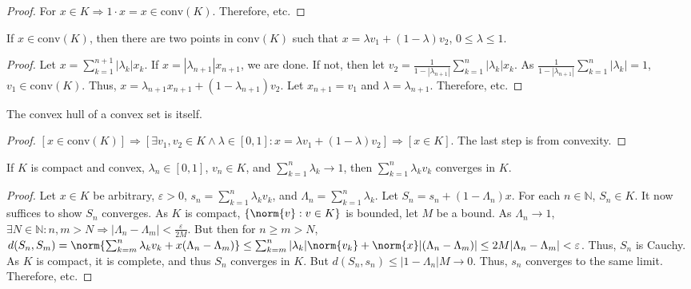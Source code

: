 \documentclass[crop=false,class=article,oneside]{standalone}
\begin{document}
        \begin{proof}
        For $x\in K \Rightarrow 1\cdot x=x \in \textrm{conv}(K)$. Therefore, etc.
        \end{proof}
        \begin{lemma}
        If $x\in \textrm{conv}(K)$, then there are two points in $\textrm{conv}(K)$ such that $x = \lambda v_1 +(1- \lambda) v_2$, $0 \leq \lambda \leq 1$.
        \end{lemma}
        \begin{proof}
        Let $x=\sum_{k=1}^{n+1}|\lambda_k| x_k$. If $x=|\lambda_{n+1}|x_{n+1}$, we are done. If not, then let $v_2 = \frac{1}{1-|\lambda_{n+1}|}\sum_{k=1}^{n}|\lambda_k|x_k$. As $\frac{1}{1-|\lambda_{n+1}|}\sum_{k=1}^{n}|\lambda_k| = 1$, $v_1\in \textrm{conv}(K)$. Thus, $x = \lambda_{n+1}x_{n+1}+(1-\lambda_{n+1})v_2$. Let $x_{n+1}=v_1$ and $\lambda = \lambda_{n+1}$. Therefore, etc.
        \end{proof}
        \begin{theorem}
        The convex hull of a convex set is itself.
        \end{theorem}
        \begin{proof}
        $[x\in \textrm{conv}(K)]\Rightarrow [\exists v_1,v_2\in K\land \lambda\in[0,1]:x=\lambda v_1+(1-\lambda)v_2]\Rightarrow [x\in K]$. The last step is from convexity.
        \end{proof}
        \begin{theorem}
        If $K$ is compact and convex, $\lambda_n\in[0,1]$, $v_n\in K$, and $\sum_{k=1}^{n}\lambda_k \rightarrow 1$, then $\sum_{k=1}^{n}\lambda_k v_k$ converges in $K$.
        \end{theorem}
        \begin{proof}
        Let $x\in K$ be arbitrary, $\varepsilon>0$, $s_n = \sum_{k=1}^{n}\lambda_k v_k$, and $\Lambda_n = \sum_{k=1}^{n}\lambda_k$. Let $S_n = s_n + (1-\Lambda_n)x$. For each $n\in \mathbb{N}$, $S_n\in K$. It now suffices to show $S_n$ converges. As $K$ is compact, $\{\norm{v}:v\in K\}$ is bounded, let $M$ be a bound. As $\Lambda_n\rightarrow 1$, $\exists N\in \mathbb{N}:n,m>N\Rightarrow |\Lambda_n-\Lambda_m|<\frac{\varepsilon}{2M}$. But then for $n\geq m >N$, $d(S_n,S_m) = \norm{\sum_{k=m}^{n}\lambda_k v_k+x(\Lambda_n-\Lambda_m)} \leq \sum_{k=m}^{n}|\lambda_k| \norm{v_k}+\norm{x}|(\Lambda_n-\Lambda_m)|\leq 2M|\Lambda_{n}-\Lambda_{m}|<\varepsilon$. Thus, $S_n$ is Cauchy. As $K$ is compact, it is complete, and thus $S_n$ converges in $K$. But $d(S_n,s_n)\leq |1-\Lambda_n|M\rightarrow 0$. Thus, $s_n$ converges to the same limit. Therefore, etc.
        \end{proof}
\end{document}
